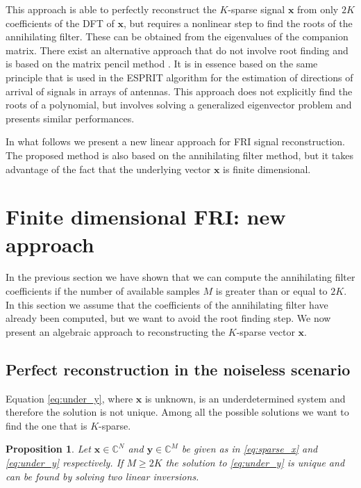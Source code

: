 \documentclass{article}
\def\x{{\bm x}}
\def\y{{\bm y}}
\def\C{{\mathbb C}}
\newtheorem{prop}{Proposition}
\begin{document}
This approach is able to perfectly reconstruct the $K$-sparse signal $\x$
from only $2K$ coefficients of the DFT of $\x$, but requires a nonlinear 
step to find the roots of the annihilating filter. These can be obtained from the 
eigenvalues of the companion matrix. 
There exist an alternative approach \cite{maravic2005} that do not involve root 
finding and is based on the 
matrix pencil method \cite{hua1990}. It is in essence based on the same principle
that is used in the ESPRIT algorithm \cite{paulraj1985} for
the estimation of directions of arrival of signals in arrays of
antennas. This approach does not explicitly find 
the roots of a polynomial, but involves solving a generalized eigenvector problem 
and presents similar performances.

In what follows we present a new linear approach for FRI signal reconstruction. The
proposed method is also based on the annihilating filter method, 
but it takes advantage of the fact that the underlying vector $\x$ is finite 
dimensional.





\section{Finite dimensional FRI: new approach}
\label{sec:finite_fri}

In the previous section we have shown that we can compute the annihilating filter coefficients 
if the number of available samples $M$ is greater than or equal to $2K$.
In this section we assume that the coefficients of the annihilating filter have already been computed, but
we want to avoid the root finding step.
We now present an algebraic approach to reconstructing the $K$-sparse vector $\x$.


\subsection{Perfect reconstruction in the noiseless scenario}

Equation \eqref{eq:under_y}, where $\x$ is unknown, is an underdetermined system and therefore the solution
is not unique. Among all the possible solutions we want to find the one that is $K$-sparse.

\begin{prop}
Let $\x \in \C^{N}$ and $\y \in \C^{M}$ be given as in \eqref{eq:sparse_x} and \eqref{eq:under_y}
respectively. If $M \geq 2K$ the solution to 
\eqref{eq:under_y} is unique and can be found by solving two linear inversions.
\label{prop}
\end{prop}
\end{document}
